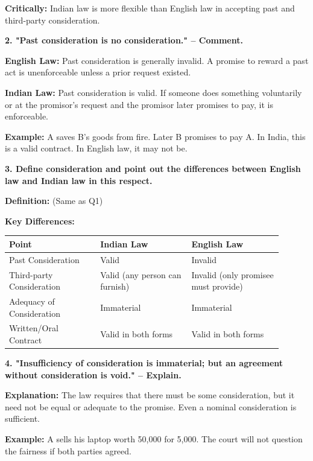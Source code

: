 \documentclass[12pt,a4paper]{book}
\begin{document}
\vspace{0.3cm}
\textbf{Critically:} Indian law is more flexible than English law in accepting past and third-party consideration.

\vspace{0.5cm}
\textbf{2. "Past consideration is no consideration." – Comment.}

\textbf{English Law:} Past consideration is generally invalid. A promise to reward a past act is unenforceable unless a prior request existed.

\textbf{Indian Law:} Past consideration is valid. If someone does something voluntarily or at the promisor’s request and the promisor later promises to pay, it is enforceable.

\textbf{Example:} A saves B’s goods from fire. Later B promises to pay A. In India, this is a valid contract. In English law, it may not be.

\vspace{0.5cm}
\textbf{3. Define consideration and point out the differences between English law and Indian law in this respect.}

\textbf{Definition:} (Same as Q1)

\textbf{Key Differences:}\\
\begin{tabular}{|p{0.3\linewidth}|p{0.3\linewidth}|p{0.3\linewidth}|}
\hline
\textbf{Point} & \textbf{Indian Law} & \textbf{English Law} \\
\hline
Past Consideration & Valid & Invalid \\
\hline
Third-party Consideration & Valid (any person can furnish) & Invalid (only promisee must provide) \\
\hline
Adequacy of Consideration & Immaterial & Immaterial \\
\hline
Written/Oral Contract & Valid in both forms & Valid in both forms \\
\hline
\end{tabular}

 
\vspace{0.5cm}
\textbf{4. "Insufficiency of consideration is immaterial; but an agreement without consideration is void." – Explain.}

\textbf{Explanation:} The law requires that there must be some consideration, but it need not be equal or adequate to the promise. Even a nominal consideration is sufficient.

\textbf{Example:} A sells his laptop worth 50,000 for 5,000. The court will not question the fairness if both parties agreed.
\end{document}
